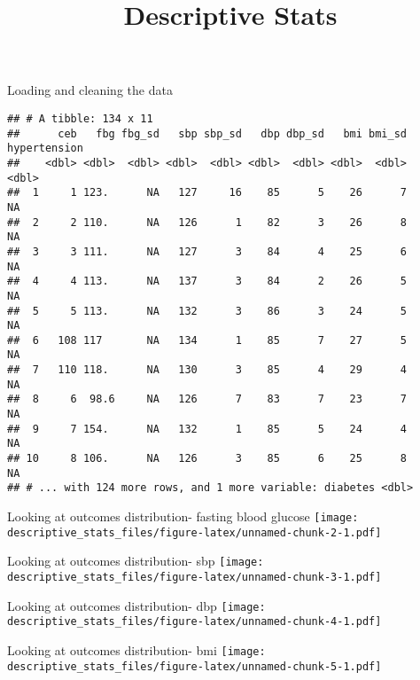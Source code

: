 \documentclass[]{article}
\title{Descriptive Stats}
\author{}
\date{}
\begin{document}
\maketitle

Loading and cleaning the data

\begin{verbatim}
## # A tibble: 134 x 11
##      ceb   fbg fbg_sd   sbp sbp_sd   dbp dbp_sd   bmi bmi_sd hypertension
##    <dbl> <dbl>  <dbl> <dbl>  <dbl> <dbl>  <dbl> <dbl>  <dbl>        <dbl>
##  1     1 123.      NA   127     16    85      5    26      7           NA
##  2     2 110.      NA   126      1    82      3    26      8           NA
##  3     3 111.      NA   127      3    84      4    25      6           NA
##  4     4 113.      NA   137      3    84      2    26      5           NA
##  5     5 113.      NA   132      3    86      3    24      5           NA
##  6   108 117       NA   134      1    85      7    27      5           NA
##  7   110 118.      NA   130      3    85      4    29      4           NA
##  8     6  98.6     NA   126      7    83      7    23      7           NA
##  9     7 154.      NA   132      1    85      5    24      4           NA
## 10     8 106.      NA   126      3    85      6    25      8           NA
## # ... with 124 more rows, and 1 more variable: diabetes <dbl>
\end{verbatim}

Looking at outcomes distribution- fasting blood glucose
\texttt{[image: descriptive\_stats\_files/figure-latex/unnamed-chunk-2-1.pdf]}

Looking at outcomes distribution- sbp
\texttt{[image: descriptive\_stats\_files/figure-latex/unnamed-chunk-3-1.pdf]}

Looking at outcomes distribution- dbp
\texttt{[image: descriptive\_stats\_files/figure-latex/unnamed-chunk-4-1.pdf]}

Looking at outcomes distribution- bmi
\texttt{[image: descriptive\_stats\_files/figure-latex/unnamed-chunk-5-1.pdf]}
\end{document}
